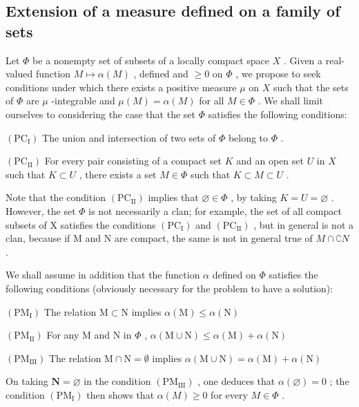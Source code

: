 \subsection{Extension of a measure defined on a family of sets}

Let \(\Phi\) be a nonempty set of subsets of a locally compact space \(X\) . Given a real-valued function \(M \mapsto \alpha(M)\) , defined and \(\geqslant 0\) on \(\Phi\) , we propose to seek conditions under which there exists a positive measure \(\mu\) on \(X\) such that the sets of \(\Phi\) are \(\mu\) -integrable and \(\mu(M) = \alpha(M)\) for all \(M \in \Phi\) . We shall limit ourselves to considering the case that the set \(\Phi\) satisfies the following conditions:

\((\mathrm{PC}_{\mathrm{I}})\) The union and intersection of two sets of \(\Phi\) belong to \(\Phi\) .

\((\mathrm{PC}_{\mathrm{II}})\) For every pair consisting of a compact set \(K\) and an open set \(U\) in \(X\) such that \(K \subset U\) , there exists a set \(M \in \Phi\) such that \(K \subset M \subset U\) .

Note that the condition \((\mathrm{PC}_{\mathrm{II}})\) implies that \(\varnothing\in\Phi\) , by taking \(K=U=\varnothing\) . However, the set \(\Phi\) is not necessarily a clan; for example, the set of all compact subsets of X satisfies the conditions \((\mathrm{PC}_{\mathrm{I}})\) and \((\mathrm{PC}_{\mathrm{II}})\) , but in general is not a clan, because if M and N are compact, the same is not in general true of \(M\cap \complement N\) .

We shall assume in addition that the function \(\alpha\) defined on \(\Phi\) satisfies the following conditions (obviously necessary for the problem to have a solution):

\((\mathrm{PM}_{\mathrm{I}})\) The relation \(\mathrm{M}\subset \mathrm{N}\) implies \(\alpha (\mathrm{M})\leqslant \alpha (\mathrm{N})\)

\((\mathrm{PM}_{\mathrm{II}})\) For any M and N in \(\Phi\) , \(\alpha (\mathrm{M}\cup \mathrm{N})\leqslant \alpha (\mathrm{M}) + \alpha (\mathrm{N})\)

\((\mathrm{PM}_{\mathrm{III}})\) The relation \(\mathrm{M}\cap \mathrm{N} = \emptyset\) implies \(\alpha (\mathrm{M}\cup \mathrm{N}) = \alpha (\mathrm{M}) + \alpha (\mathrm{N})\)

On taking \(\mathbf{N} = \varnothing\) in the condition \((\mathrm{PM}_{\mathrm{III}})\) , one deduces that \(\alpha(\varnothing) = 0\) ; the condition \((\mathrm{PM}_{\mathrm{I}})\) then shows that \(\alpha(M) \geqslant 0\) for every \(M \in \Phi\) .

